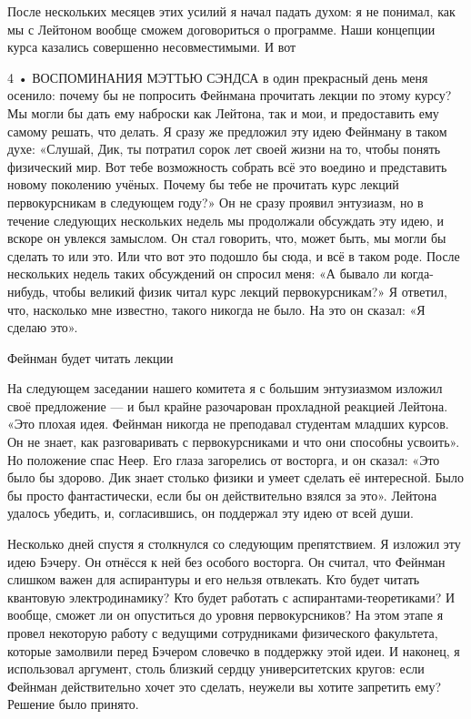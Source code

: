 \documentclass[11pt,oneside]{article}
\begin{document}
После нескольких месяцев этих усилий я начал падать духом: я не понимал, как мы с Лейтоном вообще сможем договориться о программе. Наши концепции курса казались совершенно несовместимыми. И вот\par



4 • ВОСПОМИНАНИЯ МЭТТЬЮ СЭНДСА в один прекрасный день меня осенило: почему бы не попросить Фейнмана прочитать лекции по этому курсу? Мы могли бы дать ему наброски как Лейтона, так и мои, и предоставить ему самому решать, что делать. Я сразу же предложил эту идею Фейнману в таком духе: «Слушай, Дик, ты потратил сорок лет своей жизни на то, чтобы понять физический мир. Вот тебе возможность собрать всё это воедино и представить новому поколению учёных. Почему бы тебе не прочитать курс лекций первокурсникам в следующем году?» Он не сразу проявил энтузиазм, но в течение следующих нескольких недель мы продолжали обсуждать эту идею, и вскоре он увлекся замыслом. Он стал говорить, что, может быть, мы могли бы сделать то или это. Или что вот это подошло бы сюда, и всё в таком роде. После нескольких недель таких обсуждений он спросил меня: «А бывало ли когда-нибудь, чтобы великий физик читал курс лекций первокурсникам?» Я ответил, что, насколько мне известно, такого никогда не было. На это он сказал: «Я сделаю это».\par



Фейнман будет читать лекции\par



На следующем заседании нашего комитета я с большим энтузиазмом изложил своё предложение --- и был крайне разочарован прохладной реакцией Лейтона. «Это плохая идея. Фейнман никогда не преподавал студентам младших курсов. Он не знает, как разговаривать с первокурсниками и что они способны усвоить». Но положение спас Неер. Его глаза загорелись от восторга, и он сказал: «Это было бы здорово. Дик знает столько физики и умеет сделать её интересной. Было бы просто фантастически, если бы он действительно взялся за это». Лейтона удалось убедить, и, согласившись, он поддержал эту идею от всей души.\par



Несколько дней спустя я столкнулся со следующим препятствием. Я изложил эту идею Бэчеру. Он отнёсся к ней без особого восторга. Он считал, что Фейнман слишком важен для аспирантуры и его нельзя отвлекать. Кто будет читать квантовую электродинамику? Кто будет работать с аспирантами-теоретиками? И вообще, сможет ли он опуститься до уровня первокурсников? На этом этапе я провел некоторую работу с ведущими сотрудниками физического факультета, которые замолвили перед Бэчером словечко в поддержку этой идеи. И наконец, я использовал аргумент, столь близкий сердцу университетских кругов: если Фейнман действительно хочет это сделать, неужели вы хотите запретить ему? Решение было принято.\par
\end{document}

